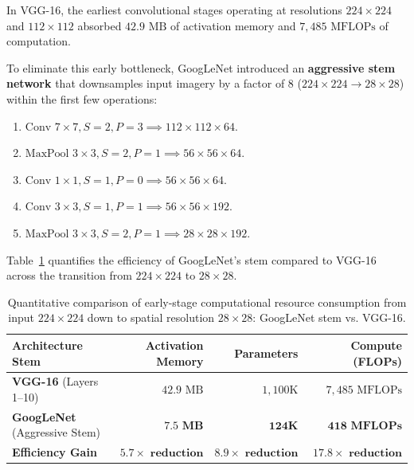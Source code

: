 In VGG-16, the earliest convolutional stages operating at resolutions $224 \times 224$ and $112 \times 112$ absorbed $42.9\text{ MB}$ of activation memory and $7,485\text{ MFLOPs}$ of computation.

To eliminate this early bottleneck, GoogLeNet introduced an \textbf{aggressive stem network} that downsamples input imagery by a factor of 8 ($224 \times 224 \to 28 \times 28$) within the first few operations:
\begin{enumerate}[noitemsep]
  \item $\text{Conv } 7 \times 7, S=2, P=3 \implies 112 \times 112 \times 64$.
  \item $\text{MaxPool } 3 \times 3, S=2, P=1 \implies 56 \times 56 \times 64$.
  \item $\text{Conv } 1 \times 1, S=1, P=0 \implies 56 \times 56 \times 64$.
  \item $\text{Conv } 3 \times 3, S=1, P=1 \implies 56 \times 56 \times 192$.
  \item $\text{MaxPool } 3 \times 3, S=2, P=1 \implies 28 \times 28 \times 192$.
\end{enumerate}

Table~\ref{tab:googlenet_stem_vs_vgg} quantifies the efficiency of GoogLeNet's stem compared to VGG-16 across the transition from $224 \times 224$ to $28 \times 28$.

\begin{table}[H]
\centering
\small
\setlength{\tabcolsep}{8pt}
\caption{Quantitative comparison of early-stage computational resource consumption from input $224 \times 224$ down to spatial resolution $28 \times 28$: GoogLeNet stem vs. VGG-16.}
\label{tab:googlenet_stem_vs_vgg}
\vspace{4pt}
\begin{tabularx}{\textwidth}{l r r r}
\toprule
\textbf{Architecture Stem} & \textbf{Activation Memory} & \textbf{Parameters} & \textbf{Compute (FLOPs)} \\
\midrule
\textbf{VGG-16} (Layers 1--10) & $42.9\text{ MB}$ & $1,100\text{K}$ & $7,485\text{ MFLOPs}$ \\
\textbf{GoogLeNet} (Aggressive Stem) & $\mathbf{7.5\text{ MB}}$ & $\mathbf{124\text{K}}$ & $\mathbf{418\text{ MFLOPs}}$ \\
\midrule
\textbf{Efficiency Gain} & $\mathbf{5.7\times\text{ reduction}}$ & $\mathbf{8.9\times\text{ reduction}}$ & $\mathbf{17.8\times\text{ reduction}}$ \\
\bottomrule
\end{tabularx}
\end{table}


